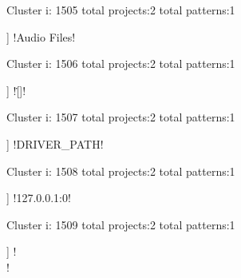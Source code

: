 Cluster i: 1505
total projects:2
total patterns:1
\begin{multicols}{1}
\begin{description}[noitemsep,topsep=0pt]
\item [[2] ] \cverb!Audio Files!
\end{description}
\end{multicols}







Cluster i: 1506
total projects:2
total patterns:1
\begin{multicols}{1}
\begin{description}[noitemsep,topsep=0pt]
\item [[2] ] \cverb![\.\-\/]!
\end{description}
\end{multicols}







Cluster i: 1507
total projects:2
total patterns:1
\begin{multicols}{1}
\begin{description}[noitemsep,topsep=0pt]
\item [[2] ] \cverb!DRIVER_PATH!
\end{description}
\end{multicols}







Cluster i: 1508
total projects:2
total patterns:1
\begin{multicols}{1}
\begin{description}[noitemsep,topsep=0pt]
\item [[2] ] \cverb!127.0.0.1:0!
\end{description}
\end{multicols}







Cluster i: 1509
total projects:2
total patterns:1
\begin{multicols}{1}
\begin{description}[noitemsep,topsep=0pt]
\item [[2] ] \cverb!\\[ntrab]!
\end{description}
\end{multicols}







